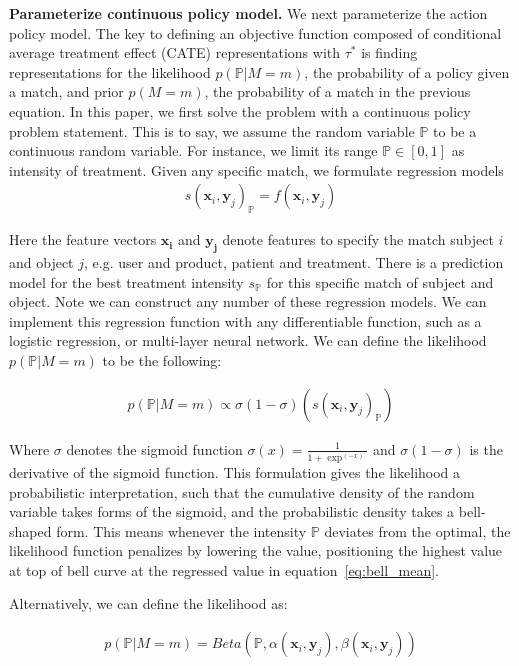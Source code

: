 \documentclass{article}
\begin{document}
\textbf{Parameterize continuous policy model.} We next parameterize the action policy model. The key to defining an objective function composed of conditional average treatment effect (CATE) representations with $\tau^*$ is finding representations for the likelihood $p(\mathbb{P} | M = m)$, the probability of a policy given a match, and prior $p(M = m)$, the probability of a match in the previous equation. In this paper, we first solve the problem with a continuous policy problem statement. This is to say, we assume the random variable $\mathbb{P}$ to be a continuous random variable. For instance, we limit its range $\mathbb{P}\in [0, 1]$ as intensity of treatment. Given any specific match, we formulate regression models 
\begin{align} 
\label{eq:bell_mean} 
s(\mathbf{x}_i, \mathbf{y}_j)_{\mathbb{P}} = f(\mathbf{x}_i, \mathbf{y}_j) 
\end{align} 

Here the feature vectors $\mathbf{x_i}$ and $\mathbf{y_j}$ denote features to specify the match subject $i$ and object $j$, e.g. user and product, patient and treatment. There is a prediction model for the best treatment intensity $s_{\mathbb{P}}$ for this specific match of subject and object. Note we can construct any number of these regression models. We can implement this regression function with any differentiable function, such as a logistic regression, or multi-layer neural network. We can define the likelihood $p(\mathbb{P} | M = m)$ to be the following: 

\begin{align} 
p(\mathbb{P} | M = m) \propto \sigma (1 - \sigma) (s(\mathbf{x}_i, \mathbf{y}_j)_{\mathbb{P}}) 
\end{align} 

Where $\sigma$ denotes the sigmoid function $\sigma(x)=\frac{1}{1 + \exp^{(-x)}}$ and $\sigma (1 - \sigma)$ is the derivative of the sigmoid function. This formulation gives the likelihood a probabilistic interpretation, such that the cumulative density of the random variable takes forms of the sigmoid, and the probabilistic density takes a bell-shaped form. This means whenever the intensity $\mathbb{P}$ deviates from the optimal, the likelihood function penalizes by lowering the value, positioning the highest value at top of bell curve at the regressed value in equation~\ref{eq:bell_mean}. 

Alternatively, we can define the likelihood as:  

\begin{align} 
p(\mathbb{P} | M = m) = Beta(\mathbb{P}, \alpha(\mathbf{x}_i, \mathbf{y}_j), \beta(\mathbf{x}_i, \mathbf{y}_j)) 
\end{align} 
\end{document}
